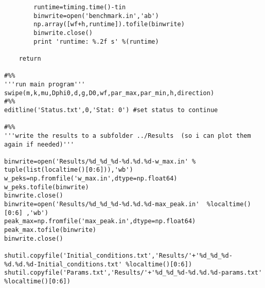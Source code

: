 \begin{lstlisting}
		runtime=timing.time()-tin
		binwrite=open('benchmark.in','ab')
		np.array([wf+h,runtime]).tofile(binwrite)
		binwrite.close() 
		print 'runtime: %.2f s' %(runtime)
		
	return 

#%%    
'''run main program'''
swipe(m,k,mu,Dphi0,d,g,D0,wf,par_max,par_min,h,direction)    
#%%
editline('Status.txt',0,'Stat: 0') #set status to continue

#%%
'''write the results to a subfolder ../Results  (so i can plot them again if needed)'''

binwrite=open('Results/%d_%d_%d-%d.%d.%d-w_max.in' % tuple(list(localtime()[0:6])),'wb') 
w_peks=np.fromfile('w_max.in',dtype=np.float64)
w_peks.tofile(binwrite)
binwrite.close()        
binwrite=open('Results/%d_%d_%d-%d.%d.%d-max_peak.in'  %localtime()[0:6] ,'wb')
peak_max=np.fromfile('max_peak.in',dtype=np.float64)
peak_max.tofile(binwrite)
binwrite.close()

shutil.copyfile('Initial_conditions.txt','Results/'+'%d_%d_%d-%d.%d.%d-Initial_conditions.txt' %localtime()[0:6])
shutil.copyfile('Params.txt','Results/'+'%d_%d_%d-%d.%d.%d-params.txt' %localtime()[0:6])

	\end{lstlisting}
	
	
%	
%	
